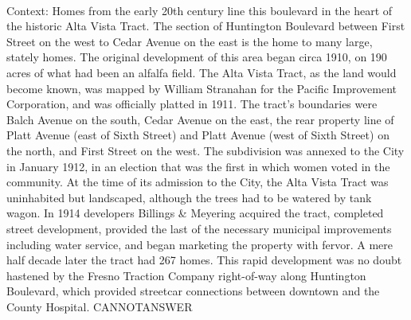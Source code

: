 \documentclass[11pt,a4paper, onecolumn]{article}
\begin{document}
\\ Context: Homes from the early 20th century line this boulevard in the heart of the historic Alta Vista Tract. The section of Huntington Boulevard between First Street on the west to Cedar Avenue on the east is the home to many large, stately homes. The original development of this area began circa 1910, on 190 acres of what had been an alfalfa field. The Alta Vista Tract, as the land would become known, was mapped by William Stranahan for the Pacific Improvement Corporation, and was officially platted in 1911. The tract's boundaries were Balch Avenue on the south, Cedar Avenue on the east, the rear property line of Platt Avenue (east of Sixth Street) and Platt Avenue (west of Sixth Street) on the north, and First Street on the west. The subdivision was annexed to the City in January 1912, in an election that was the first in which women voted in the community. At the time of its admission to the City, the Alta Vista Tract was uninhabited but landscaped, although the trees had to be watered by tank wagon. In 1914 developers Billings & Meyering acquired the tract, completed street development, provided the last of the necessary municipal improvements including water service, and began marketing the property with fervor. A mere half decade later the tract had 267 homes. This rapid development was no doubt hastened by the Fresno Traction Company right-of-way along Huntington Boulevard, which provided streetcar connections between downtown and the County Hospital. CANNOTANSWER
\end{document}
